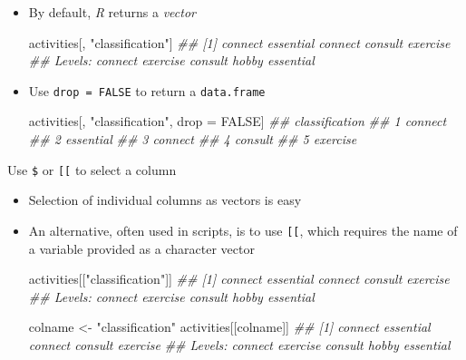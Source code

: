 \documentclass[]{book}
\newenvironment{Shaded}{\begin{snugshade}}{\end{snugshade}}
\newcommand{\CommentTok}[1]{\textcolor[rgb]{0.56,0.35,0.01}{\textit{#1}}}
\newcommand{\NormalTok}[1]{#1}
\newcommand{\OperatorTok}[1]{\textcolor[rgb]{0.81,0.36,0.00}{\textbf{#1}}}
\newcommand{\OtherTok}[1]{\textcolor[rgb]{0.56,0.35,0.01}{#1}}
\newcommand{\StringTok}[1]{\textcolor[rgb]{0.31,0.60,0.02}{#1}}
\begin{document}
\begin{itemize}
  \begin{itemize}
  \item
    By default, \emph{R} returns a \emph{vector}

\begin{Shaded}
\begin{Highlighting}[]
\NormalTok{activities[, }\StringTok{"classification"}\NormalTok{]}
\CommentTok{## [1] connect   essential connect   consult   exercise }
\CommentTok{## Levels: connect exercise consult hobby essential}
\end{Highlighting}
\end{Shaded}
  \item
    Use \texttt{drop\ =\ FALSE} to return a \texttt{data.frame}

\begin{Shaded}
\begin{Highlighting}[]
\NormalTok{activities[, }\StringTok{"classification"}\NormalTok{, drop =}\StringTok{ }\OtherTok{FALSE}\NormalTok{]}
\CommentTok{##   classification}
\CommentTok{## 1        connect}
\CommentTok{## 2      essential}
\CommentTok{## 3        connect}
\CommentTok{## 4        consult}
\CommentTok{## 5       exercise}
\end{Highlighting}
\end{Shaded}
  \end{itemize}
\end{itemize}

Use \texttt{\$} or \texttt{{[}{[}} to select a column

\begin{itemize}
\item
  Selection of individual columns as vectors is easy

\begin{Shaded}
\end{Shaded}
\item
  An alternative, often used in scripts, is to use \texttt{{[}{[}}, which requires the name of a variable provided as a character vector

\begin{Shaded}
\begin{Highlighting}[]
\NormalTok{activities[[}\StringTok{"classification"}\NormalTok{]]}
\CommentTok{## [1] connect   essential connect   consult   exercise }
\CommentTok{## Levels: connect exercise consult hobby essential}

\NormalTok{colname <-}\StringTok{ "classification"}
\NormalTok{activities[[colname]]}
\CommentTok{## [1] connect   essential connect   consult   exercise }
\CommentTok{## Levels: connect exercise consult hobby essential}
\end{Highlighting}
\end{Shaded}
\end{itemize}
\end{document}

